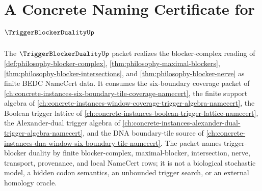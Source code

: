 \chapter{A Concrete Naming Certificate for $\TriggerBlockerDualityUp$}
\label{ch:concrete-instances-trigger-blocker-duality-namecert}

The $\TriggerBlockerDualityUp$ packet realizes the blocker-complex reading of \autoref{def:philosophy-blocker-complex}, \autoref{thm:philosophy-maximal-blockers}, \autoref{thm:philosophy-blocker-intersections}, and \autoref{thm:philosophy-blocker-nerve} as finite BEDC NameCert data. It consumes the six-boundary coverage packet of \autoref{ch:concrete-instances-six-boundary-tile-coverage-namecert}, the finite support algebra of \autoref{ch:concrete-instances-window-coverage-trigger-algebra-namecert}, the Boolean trigger lattice of \autoref{ch:concrete-instances-boolean-trigger-lattice-namecert}, the Alexander-dual trigger algebra of \autoref{ch:concrete-instances-alexander-dual-trigger-algebra-namecert}, and the DNA boundary-tile source of \autoref{ch:concrete-instances-dna-window-six-boundary-tile-namecert}. The packet names trigger-blocker duality by finite blocker-complex, maximal-blocker, intersection, nerve, transport, provenance, and local NameCert rows; it is not a biological stochastic model, a hidden codon semantics, an unbounded trigger search, or an external homology oracle.

